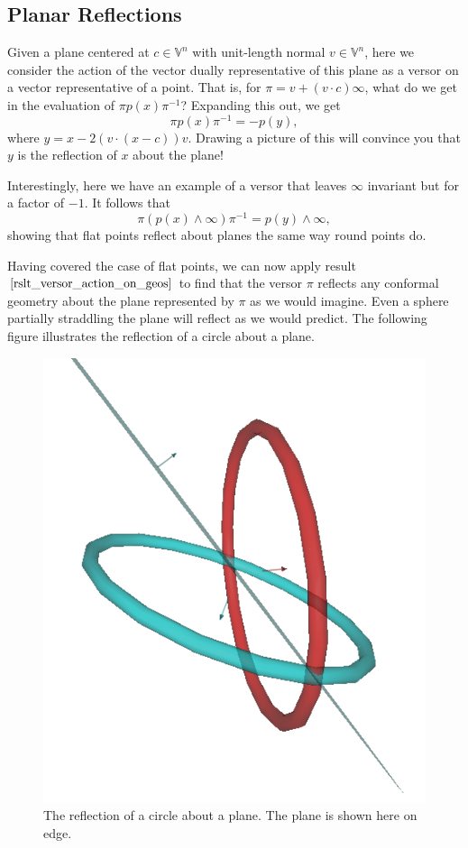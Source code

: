 \documentclass[12pt]{article}
\newcommand{\V}{\mathbb{V}}
\newcommand{\nvai}{\infty}
\begin{document}
\subsection{Planar Reflections}\label{sec_planar_reflections}

Given a plane centered at $c\in\V^n$ with unit-length normal $v\in\V^n$,
here we consider the action of the vector dually representative of this plane
as a versor on a vector representative of a point.  That is, for $\pi=v+(v\cdot c)\nvai$,
what do we get in the evaluation of $\pi p(x)\pi^{-1}$?  Expanding this out, we get
\begin{equation*}
\pi p(x)\pi^{-1} = -p(y),
\end{equation*}
where $y=x-2(v\cdot (x-c))v$.  Drawing a picture
of this will convince you that $y$ is the reflection of $x$ about the plane!

Interestingly, here we have an example of a versor that leaves $\nvai$
invariant but for a factor of $-1$.  It follows that
\begin{equation*}
\pi(p(x)\wedge\nvai)\pi^{-1} = p(y)\wedge\nvai,
\end{equation*}
showing that flat points reflect about planes the same way round points do.

Having covered the case of flat points, we can now apply result $\eqref{rslt_versor_action_on_geos}$
to find that the versor $\pi$ reflects any conformal geometry about the plane represented by
$\pi$ as we would imagine.  Even a sphere partially straddling the plane will reflect as we would predict.
The following figure illustrates the reflection of a circle about a plane.
\begin{figure}[H]
\centering
\includegraphics[scale=0.3]{ReflectionOfCircleAboutPlaneFigure}
\caption{The reflection of a circle about a plane.  The plane is shown here on edge.}
\end{figure}
\end{document}
